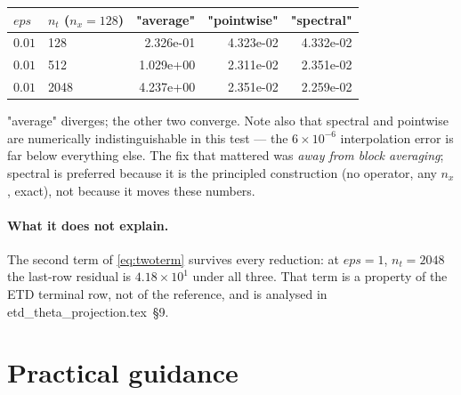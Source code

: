 \documentclass[11pt]{article}
\newcommand{\eps}{\varepsilon}
\newcommand{\dt}{\Delta t}
\newcommand{\dx}{\Delta x}
\newcommand{\code}[1]{\texttt{#1}}
\def\eps{eps}\def\dt{dt}\def\dx{dx}\def\code#1{#1}%
\begin{document}
\begin{center}
\begin{tabular}{@{}llrrr@{}}
\toprule
$\eps$ & $n_t$ ($n_x=128$) & \code{"average"} & \code{"pointwise"} & \code{"spectral"} \\
\midrule
$0.01$ & 128  & 2.326e-01 & 4.323e-02 & 4.332e-02 \\
$0.01$ & 512  & 1.029e+00 & 2.311e-02 & 2.351e-02 \\
$0.01$ & 2048 & 4.237e+00 & 2.351e-02 & 2.259e-02 \\
\bottomrule
\end{tabular}
\end{center}

\noindent
\code{"average"} diverges; the other two converge. Note also that spectral and
pointwise are numerically indistinguishable in this test --- the $6\times
10^{-6}$ interpolation error is far below everything else. The fix that
mattered was \emph{away from block averaging}; spectral is preferred because it
is the principled construction (no operator, any $n_x$, exact), not because it
moves these numbers.

\paragraph{What it does not explain.} The second term of \eqref{eq:twoterm}
survives every reduction: at $\eps=1$, $n_t=2048$ the last-row residual is
$4.18\times10^{1}$ under all three. That term is a property of the ETD terminal
row, not of the reference, and is analysed in
\code{etd\_theta\_projection.tex}~\S9.

\section{Practical guidance}
\end{document}
